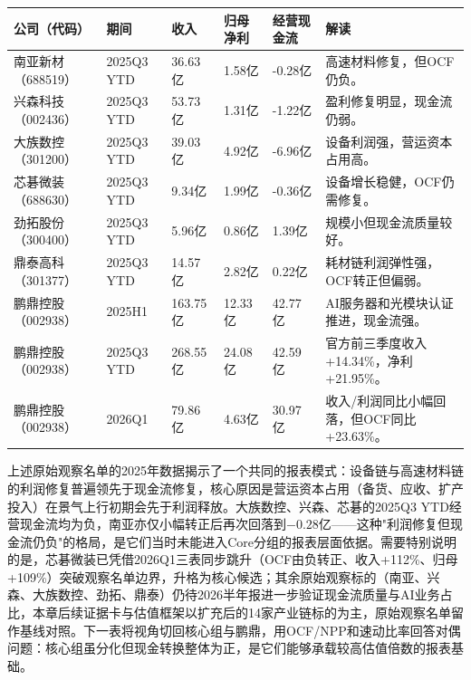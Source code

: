 \begin{exhibitbox}[图表6-5：原始观察名单季度交付桥（2025基线）]
\footnotesize
\begin{tabularx}{\textwidth}{L{1.8cm}L{1.8cm}R{1.7cm}R{1.6cm}R{1.7cm}X}
\toprule
\textbf{公司（代码）} & \textbf{期间} & \textbf{收入} & \textbf{归母净利} & \textbf{经营现金流} & \textbf{解读} \\
\midrule
南亚新材（688519） & 2025Q3 YTD & 36.63亿 & 1.58亿 & -0.28亿 & 高速材料修复，但OCF仍负。 \\
兴森科技（002436） & 2025Q3 YTD & 53.73亿 & 1.31亿 & -1.22亿 & 盈利修复明显，现金流仍弱。 \\
大族数控（301200） & 2025Q3 YTD & 39.03亿 & 4.92亿 & -6.96亿 & 设备利润强，营运资本占用高。 \\
芯碁微装（688630） & 2025Q3 YTD & 9.34亿 & 1.99亿 & -0.36亿 & 设备增长稳健，OCF仍需修复。 \\
劲拓股份（300400） & 2025Q3 YTD & 5.96亿 & 0.86亿 & 1.39亿 & 规模小但现金流质量较好。 \\
鼎泰高科（301377） & 2025Q3 YTD & 14.57亿 & 2.82亿 & 0.22亿 & 耗材链利润弹性强，OCF转正但偏弱。 \\
鹏鼎控股（002938） & 2025H1 & 163.75亿 & 12.33亿 & 42.77亿 & AI服务器和光模块认证推进，现金流强。 \\
鹏鼎控股（002938） & 2025Q3 YTD & 268.55亿 & 24.08亿 & 42.59亿 & 官方前三季度收入+14.34\%，净利+21.95\%。 \\
鹏鼎控股（002938） & 2026Q1 & 79.86亿 & 4.63亿 & 30.97亿 & 收入/利润同比小幅回落，但OCF同比+23.63\%。 \\
\bottomrule
\end{tabularx}
\end{exhibitbox}

上述原始观察名单的2025年数据揭示了一个共同的报表模式：设备链与高速材料链的利润修复普遍领先于现金流修复，核心原因是营运资本占用（备货、应收、扩产投入）在景气上行初期会先于利润释放。大族数控、兴森、芯碁的2025Q3 YTD经营现金流均为负，南亚亦仅小幅转正后再次回落到$-0.28$亿——这种"利润修复但现金流仍负"的格局，是它们当时未能进入Core分组的报表层面依据。需要特别说明的是，芯碁微装已凭借2026Q1三表同步跳升（OCF由负转正、收入+112\%、归母+109\%）突破观察名单边界，升格为核心候选；其余原始观察标的（南亚、兴森、大族数控、劲拓、鼎泰）仍待2026半年报进一步验证现金流质量与AI业务占比，本章后续证据卡与估值框架以扩充后的14家产业链标的为主，原始观察名单留作基线对照。下一表将视角切回核心组与鹏鼎，用OCF/NPP和速动比率回答对偶问题：核心组虽分化但现金转换整体为正，是它们能够承载较高估值倍数的报表基础。

